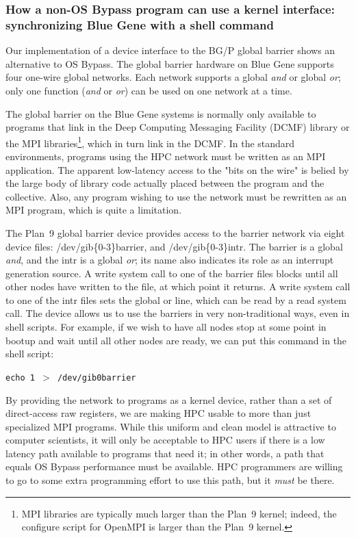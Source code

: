 \documentclass[a4,10pt,preprint]{sigplanconf}
\begin{document}
\subsubsection{How a non-OS Bypass program can use a kernel interface: synchronizing Blue Gene with a shell command}
Our implementation of a device interface to the BG/P global barrier shows an alternative to OS Bypass.
The global barrier hardware on Blue Gene supports four one-wire global networks. Each network supports a global \textit{and} or global \textit{or}; only one function (\textit{and} or \textit{or}) can be used on one network at a time. 

The global barrier on the Blue Gene systems is normally only 
available to programs that link in the Deep Computing Messaging Facility (DCMF) library or the 
MPI libraries\footnote{MPI libraries are typically much larger than the Plan~9 kernel; indeed, the configure script for OpenMPI is larger than the Plan~9 kernel.}, which in turn 
link in the DCMF. In the standard environments,  programs using the  HPC network must be written as an MPI 
application. The apparent low-latency access to the "bits on the wire"  is belied by the large body of library code actually placed between the program and the collective. 
Also, any program wishing to use the network must be rewritten as an MPI program, which is quite a limitation. 

The Plan~9 global barrier device provides access to the barrier network via eight device files: /dev/gib\{0-3\}barrier, and /dev/gib\{0-3\}intr. The barrier is a global \textit{and}, and the intr is a global \textit{or}; its name also indicates its role as an interrupt generation source. 
A write system call to one of the barrier files blocks until all other nodes have written to the file, at which point it returns. A write system call to one of the intr files sets the global or line, which can be read by a read system call. 
The device allows us to use the barriers in very non-traditional ways, even in shell scripts. For example, if we wish to have all nodes stop at some point in bootup and wait until all other nodes are ready, we can put this command in the shell script: 

\texttt{echo 1 $>$ /dev/gib0barrier}

By providing the network to programs as a kernel device, rather than a set of direct-access raw registers, we are making HPC usable 
to more than just specialized  MPI programs. While this uniform and clean model is attractive to computer scientists, it will only be acceptable to HPC users if there is a low latency path available to programs that need it; 
in other words, a path that equals OS Bypass performance must be available. HPC programmers are willing to go to some extra programming effort to use this path, but it 
{\em must} be there. 
\end{document}
